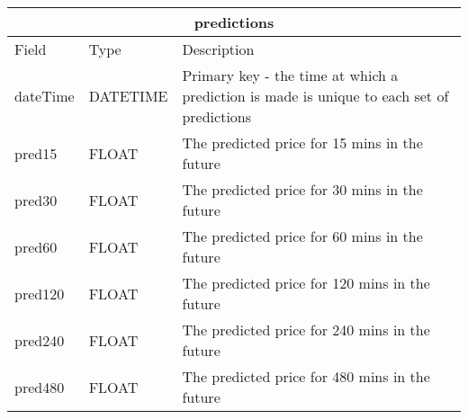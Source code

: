             \begin{tabular}{|p{2cm}|p{2cm}|p{7cm}|}
                \hline
                \multicolumn{3}{|c|}{predictions} \\
                \hline
                Field & Type & Description \\
                \hline
                dateTime & DATETIME & Primary key - the time at which a prediction is made is unique to each set of predictions\\
                pred15 & FLOAT & The predicted price for 15 mins in the future \\
                pred30 & FLOAT & The predicted price for 30 mins in the future \\
                pred60 & FLOAT & The predicted price for 60 mins in the future \\
                pred120 & FLOAT & The predicted price for 120 mins in the future \\
                pred240 & FLOAT & The predicted price for 240 mins in the future \\
                pred480 & FLOAT & The predicted price for 480 mins in the future \\
                \hline
            \end{tabular}
            
            